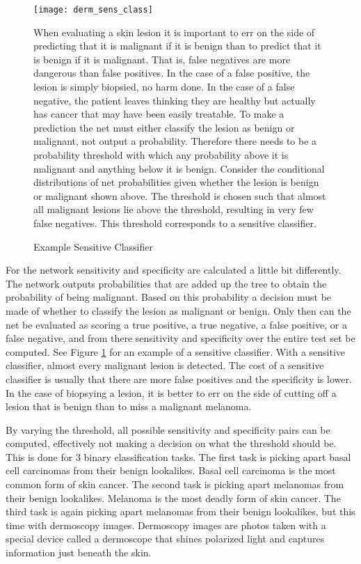 \begin{figure}
\texttt{[image: derm\_sens\_class]}
\caption{Example Sensitive Classifier}
\vspace{12px}
When evaluating a skin lesion it is important to err on the side of predicting that it is malignant if it is benign than to predict that it is benign if it is malignant.  That is, false negatives are more dangerous than false positives.  In the case of a false positive, the lesion is simply biopsied, no harm done.  In the case of a false negative, the patient leaves thinking they are healthy but actually has cancer that may have been easily treatable.  To make a prediction the net must either classify the lesion as benign or malignant, not output a probability.  Therefore there needs to be a probability threshold with which any probability above it is malignant and anything below it is benign.  Consider the conditional distributions of net probabilities given whether the lesion is benign or malignant shown above.  The threshold is chosen such that almost all malignant lesions lie above the threshold, resulting in very few false negatives.  This threshold corresponds to a sensitive classifier.
\vspace{12px}
\label{fig:derm_sens_class}
\end{figure}

For the network sensitivity and specificity are calculated a little bit differently.  The network outputs probabilities that are added up the tree to obtain the probability of being malignant.  Based on this probability a decision must be made of whether to classify the lesion as malignant or benign.  Only then can the net be evaluated as scoring a true positive, a true negative, a false positive, or a false negative, and from there sensitivity and specificity over the entire test set be computed.  See Figure \ref{fig:derm_sens_class} for an example of a sensitive classifier.  With a sensitive classifier, almost every malignant lesion is detected.  The cost of a sensitive classifier is usually that there are more false positives and the specificity is lower.  In the case of biopsying a lesion, it is better to err on the side of cutting off a lesion that is benign than to miss a malignant melanoma.

By varying the threshold, all possible sensitivity and specificity pairs can be computed, effectively not making a decision on what the threshold should be.  This is done for 3 binary classification tasks.  The first task is picking apart basal cell carcinomas from their benign lookalikes.  Basal cell carcinoma is the most common form of skin cancer.  The second task is picking apart melanomas from their benign lookalikes.  Melanoma is the most deadly form of skin cancer.  The third task is again picking apart melanomas from their benign lookalikes, but this time with dermoscopy images.  Dermoscopy images are photos taken with a special device called a dermoscope that shines polarized light and captures information just beneath the skin.

